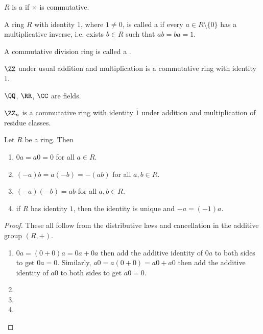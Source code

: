 $R$ is a  if $\times$ is commutative.

\begin{definition}
A ring $R$ with identity $1$, where $1\neq0$, is called a  if every $a\in R\setminus\{0\}$ has a multiplicative inverse, i.e. exists $b\in R$ such that $ab=ba=1$.

A commutative division ring is called a .
\end{definition}

\begin{figure}[H]
\centering
{}
\end{figure}

\begin{example}
$\ZZ$ under usual addition and multiplication is a commutative ring with identity $1$.

$\QQ$, $\RR$, $\CC$ are fields.

$\ZZ_n$ is a commutative ring with identity $\bar{1}$ under addition and multiplication of residue classes.
\end{example}

\begin{proposition}
Let $R$ be a ring. Then
\begin{enumerate}[label=(\roman*)]
\item $0a=a0=0$ for all $a\in R$.
\item $(-a)b=a(-b)=-(ab)$ for all $a,b\in R$.
\item $(-a)(-b)=ab$ for all $a,b\in R$.
\item if $R$ has identity $1$, then the identity is unique and $-a=(-1)a$.
\end{enumerate}
\end{proposition}

\begin{proof}
These all follow from the distributive laws and cancellation in the additive group $(R,+)$.
\begin{enumerate}[label=(\roman*)]
\item $0a=(0+0)a=0a+0a$ then add the additive identity of $0a$ to both sides to get $0a=0$. Similarly, $a0=a(0+0)=a0+a0$ then add the additive identity of $a0$ to both sides to get $a0=0$.
\item 
\item 
\item 
\end{enumerate}
\end{proof}

